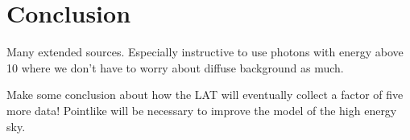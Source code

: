 \documentclass[12pt,preprint]{aastex}
\newcommand{\gev}{\text{GeV}\xspace}
\begin{document}

\section{Conclusion}


Many extended sources. Especially instructive to
use photons with energy above 10 \gev where we don't have
to worry about diffuse background as much.

Make some conclusion about how the LAT will eventually collect a factor
of five more data! Pointlike will be necessary to improve the model of the
high energy sky.




\appendix
\end{document}
